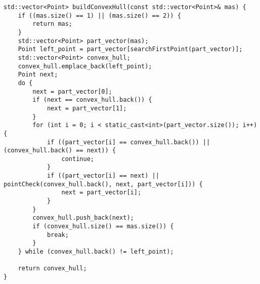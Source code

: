 \documentclass{report}
\begin{document}
\begin{lstlisting}
std::vector<Point> buildConvexHull(const std::vector<Point>& mas) {
    if ((mas.size() == 1) || (mas.size() == 2)) {
        return mas;
    }
    std::vector<Point> part_vector(mas);
    Point left_point = part_vector[searchFirstPoint(part_vector)];
    std::vector<Point> convex_hull;
    convex_hull.emplace_back(left_point);
    Point next;
    do {
        next = part_vector[0];
        if (next == convex_hull.back()) {
            next = part_vector[1];
        }
        for (int i = 0; i < static_cast<int>(part_vector.size()); i++) {
            if ((part_vector[i] == convex_hull.back()) || (convex_hull.back() == next)) {
                continue;
            }
            if ((part_vector[i] == next) || pointCheck(convex_hull.back(), next, part_vector[i])) {
                next = part_vector[i];
            }
        }
        convex_hull.push_back(next);
        if (convex_hull.size() == mas.size()) {
            break;
        }
    } while (convex_hull.back() != left_point);

    return convex_hull;
}

\end{lstlisting}
\end{document}
